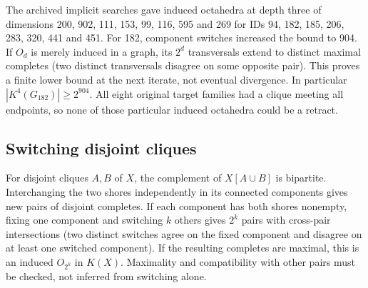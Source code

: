 \documentclass[11pt,a4paper]{article}
\theoremstyle{definition}\newtheorem{definition}[theorem]{Definition}\newtheorem{example}[theorem]{Example}
\theoremstyle{remark}\newtheorem{remark}[theorem]{Remark}
\begin{document}
The archived implicit searches gave induced octahedra at depth three of dimensions 200, 902, 111, 153, 99, 116, 595 and 269 for IDs 94, 182, 185, 206, 283, 320, 441 and 451. For 182, component switches increased the bound to 904. If \(O_d\) is merely induced in a graph, its \(2^d\) transversals extend to distinct maximal completes (two distinct transversals disagree on some opposite pair). This proves a finite lower bound at the next iterate, not eventual divergence. In particular \(|K^4(G_{182})|\ge 2^{904}\). All eight original target families had a clique meeting all endpoints, so none of those particular induced octahedra could be a retract.

\subsection{Switching disjoint cliques}
For disjoint cliques \(A,B\) of \(X\), the complement of \(X[A\cup B]\) is bipartite. Interchanging the two shores independently in its connected components gives new pairs of disjoint completes. If each component has both shores nonempty, fixing one component and switching \(k\) others gives \(2^k\) pairs with cross-pair intersections (two distinct switches agree on the fixed component and disagree on at least one switched component). If the resulting completes are maximal, this is an induced \(O_{2^k}\) in \(K(X)\). Maximality and compatibility with other pairs must be checked, not inferred from switching alone.
\end{document}
